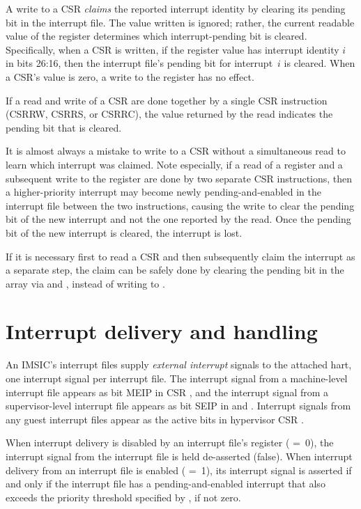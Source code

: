 A write to a  CSR \emph{claims} the reported interrupt
identity by clearing its pending bit in the interrupt file.
The value written is ignored;
rather, the current readable value of the register determines which
interrupt-pending bit is cleared.
Specifically, when a  CSR is written, if the register value
has interrupt identity $i$ in bits 26:16, then the interrupt file's
pending bit for interrupt~$i$ is cleared.
When a  CSR's value is zero, a write to the register has no
effect.

If a read and write of a  CSR are done together by a single
CSR instruction (CSRRW, CSRRS, or CSRRC), the value returned by the
read indicates the pending bit that is cleared.

\begin{commentary}
It is almost always a mistake to write to a  CSR without a
simultaneous read to learn which interrupt was claimed.
Note especially, if a read of a  register and a subsequent
write to the register are done by two separate CSR instructions, then
a higher-priority interrupt may become newly pending-and-enabled in the
interrupt file between the two instructions, causing the write to clear
the pending bit of the new interrupt and not the one reported by the
read.
Once the pending bit of the new interrupt is cleared, the interrupt is
lost.

If it is necessary first to read a  CSR and then subsequently
claim the interrupt as a separate step, the claim can be safely done by
clearing the pending bit in the  array
via  and ,
instead of writing to .
\end{commentary}

\section{Interrupt delivery and handling}

An IMSIC's interrupt files supply \emph{external interrupt} signals to
the attached hart, one interrupt signal per interrupt file.
The interrupt signal from a machine-level interrupt file appears as bit
MEIP in CSR , and the interrupt signal from a supervisor-level
interrupt file appears as bit SEIP in  and .
Interrupt signals from any guest interrupt files appear as the active
bits in hypervisor CSR .

When interrupt delivery is disabled by an interrupt file's
 register ( =~0), the interrupt signal from
the interrupt file is held de-asserted (false).
When interrupt delivery from an interrupt file is enabled
( =~1), its interrupt signal is asserted if and only
if the interrupt file has a pending-and-enabled interrupt that also
exceeds the priority threshold specified by , if not
zero.

